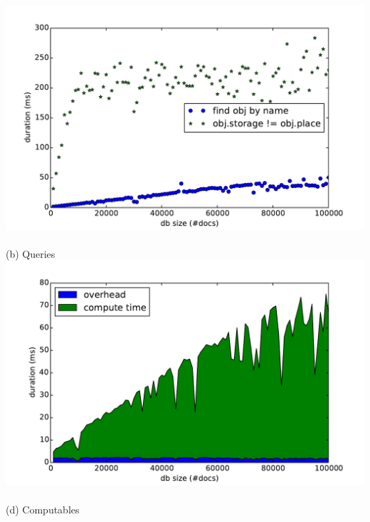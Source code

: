 \begin{frame}
\begin{columns}
\begin{column}{0.55\textwidth}
  \centering
    \small
    \\\vspace{-0.15cm}
    \includegraphics[width=\textwidth]{../thesis/plots/query-durations}\\
    \\\vspace{-0.05cm}
    (b) Queries
    \\\vspace{-0.1cm}
    \includegraphics[width=\textwidth]{../thesis/plots/computable-durations}\\
    \\\vspace{-0.05cm}
    (d) Computables
    \end{column}
  \end{columns}
\end{frame}

